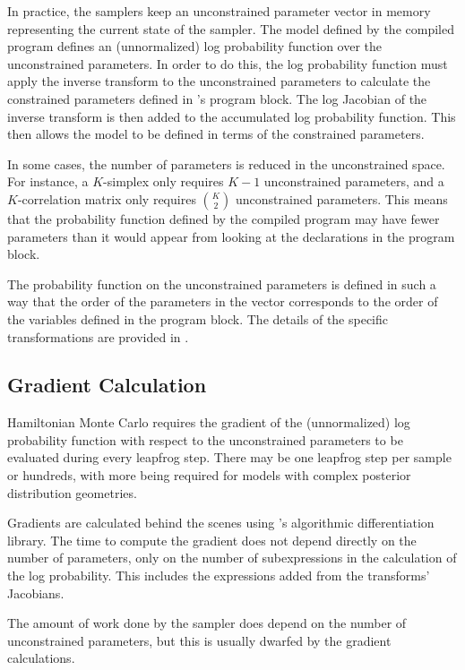 In practice, the samplers keep an unconstrained parameter vector in
memory representing the current state of the sampler.  The model
defined by the compiled \Stan program defines an (unnormalized) log
probability function over the unconstrained parameters.  In order to
do this, the log probability function must apply the inverse transform
to the unconstrained parameters to calculate the constrained
parameters defined in \Stan's  program block.  The
log Jacobian of the inverse transform is then added to the accumulated
log probability function.  This then allows the \Stan model to be
defined in terms of the constrained parameters.

In some cases, the number of parameters is reduced in the
unconstrained space.  For instance, a $K$-simplex only requires $K-1$
unconstrained parameters, and a $K$-correlation matrix only requires
${K \choose 2}$ unconstrained parameters.  This means that the
probability function defined by the compiled \Stan program may have
fewer parameters than it would appear from looking at the declarations
in the  program block. 

The probability function on the unconstrained parameters is defined in
such a way that the order of the parameters in the vector corresponds
to the order of the variables defined in the  program
block.  The details of the specific transformations are provided in
.

\subsection{Gradient Calculation}

Hamiltonian Monte Carlo requires the gradient of the (unnormalized)
log probability function with respect to the unconstrained parameters
to be evaluated during every leapfrog step.  There may be one leapfrog
step per sample or hundreds, with more being required for models with
complex posterior distribution geometries.

Gradients are calculated behind the scenes using \Stan's algorithmic
differentiation library.  The time to compute the gradient does not
depend directly on the number of parameters, only on the number of
subexpressions in the calculation of the log probability.  This
includes the expressions added from the transforms' Jacobians.  

The amount of work done by the sampler does depend on the number of
unconstrained parameters, but this is usually dwarfed by the gradient
calculations.

